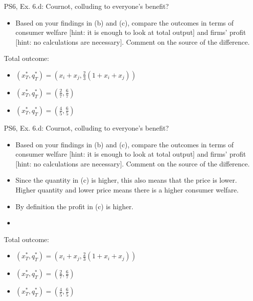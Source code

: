\begin{frame}{PS6, Ex. 6.d: Cournot, colluding to everyone's benefit?}
    \begin{itemize}
    \item[(d)] Based on your findings in (b) and (c), compare the outcomes in terms of consumer welfare [hint: it is enough to look at total output] and firms’ profit [hint: no calculations are necessary]. Comment on the source of the difference.
    \end{itemize}
    \vspace{-10pt}
  \begin{multicols}{2}
    \vfill\null \columnbreak
    Total outcome:
    \begin{itemize}
    \item[(a)] $(x_T^{*},q_T^{*})= \left(x_i+x_j, \frac{2}{3}(1+x_i+x_j)\right)$
    \item[(b)] $(x_T^{*},q_T^{*})= \left(\frac{2}{7},\frac{6}{7}\right)$
    \item[(c)] $(x_T^{*},q_T^{*})= \left(\frac{4}{5},\frac{6}{5}\right)$
    \end{itemize}
    \vfill\null
  \end{multicols}
\end{frame}
\begin{frame}{PS6, Ex. 6.d: Cournot, colluding to everyone's benefit?}
    \begin{itemize}
    \item[(d)] Based on your findings in (b) and (c), compare the outcomes in terms of consumer welfare [hint: it is enough to look at total output] and firms’ profit [hint: no calculations are necessary]. Comment on the source of the difference.
    \end{itemize}
    \vspace{-10pt}
  \begin{multicols}{2}
    \begin{itemize}
      \item Since the quantity in (c) is higher, this also means that the price is lower. Higher quantity and lower price means there is a higher consumer welfare.
      \item By definition the profit in (c) is higher.
      \item {}
    \end{itemize}
    \vfill\null \columnbreak
    Total outcome:
    \begin{itemize}
    \item[(a)] $(x_T^{*},q_T^{*})= \left(x_i+x_j, \frac{2}{3}(1+x_i+x_j)\right)$
    \item[(b)] $(x_T^{*},q_T^{*})= \left(\frac{2}{7},\frac{6}{7}\right)$
    \item[(c)] $(x_T^{*},q_T^{*})= \left(\frac{4}{5},\frac{6}{5}\right)$
    \end{itemize}
    \vfill\null
  \end{multicols}
\end{frame}




